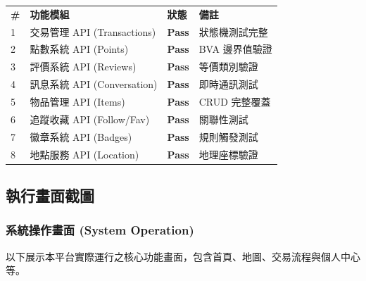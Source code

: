 \documentclass[11pt, a4paper]{article}
\begin{document}
\begin{center}
  \renewcommand{\arraystretch}{1.3}
  \begin{longtable}{p{} p{} p{} p{}}
    \rowcolor{NavyBlue} \color{white}\textbf{\#} & \color{white}\textbf{功能模組} & \color{white}\textbf{狀態}                & \color{white}\textbf{備註} \\
    1                                            & 交易管理 API (Transactions)    & \textcolor{SuccessGreen}{\textbf{Pass}} & 狀態機測試完整                  \\
    \rowcolor{LightGray} 2                       & 點數系統 API (Points)          & \textcolor{SuccessGreen}{\textbf{Pass}} & BVA 邊界值驗證                \\
    3                                            & 評價系統 API (Reviews)         & \textcolor{SuccessGreen}{\textbf{Pass}} & 等價類別驗證                   \\
    \rowcolor{LightGray} 4                       & 訊息系統 API (Conversation)    & \textcolor{SuccessGreen}{\textbf{Pass}} & 即時通訊測試                   \\
    5                                            & 物品管理 API (Items)           & \textcolor{SuccessGreen}{\textbf{Pass}} & CRUD 完整覆蓋                \\
    \rowcolor{LightGray} 6                       & 追蹤收藏 API (Follow/Fav)      & \textcolor{SuccessGreen}{\textbf{Pass}} & 關聯性測試                    \\
    7                                            & 徽章系統 API (Badges)          & \textcolor{SuccessGreen}{\textbf{Pass}} & 規則觸發測試                   \\
    \rowcolor{LightGray} 8                       & 地點服務 API (Location)        & \textcolor{SuccessGreen}{\textbf{Pass}} & 地理座標驗證                   \\
  \end{longtable}
\end{center}

\subsection{執行畫面截圖}

\subsubsection{系統操作畫面 (System Operation)}
以下展示本平台實際運行之核心功能畫面，包含首頁、地圖、交易流程與個人中心等。
\end{document}
